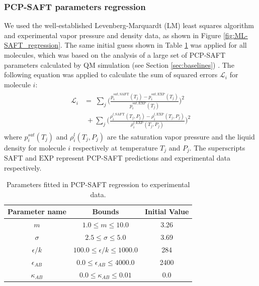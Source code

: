 \subsubsection{PCP-SAFT parameters regression}

We used the well-established Levenberg-Marquardt (LM) least squares algorithm and experimental vapor pressure and density data, as shown in Figure \ref{fig:ML-SAFT_regression}. The same initial guess shown in Table \ref{tab:regression_params} was applied for all molecules, which was based on the analysis of a large set of PCP-SAFT parameters calculated by QM simulation (see Section \ref{sec:baselines}) \cite{Kaminski2020}. The following equation was applied to calculate the sum of squared errors $\mathcal{L}_i$ for molecule $i$:
\begin{gather}
\begin{aligned}
    \mathcal{L}_i & = \; \sum_j \biggl(\frac{p_{i}^{sat,\text{SAFT}}(T_j) - p_{i}^{sat,\text{EXP}}(T_j)}{ p_{i}^{sat,\text{EXP}}(T_j)}\biggr)^2 \\
    & \; + \sum_j \biggl(\frac{\rho_{i}^{l,\text{SAFT}}(T_j, P_j) - \rho_{i}^{l,\text{EXP}}(T_j, P_j) }{\rho_{i}^{l,\text{EXP}}(T_j, P_j) }\biggr)^2 
\end{aligned}
\end{gather}
where $p_i^{sat}(T_j)$ and $\rho_{i}^{l}(T_j, P_j)$ are the saturation vapor pressure and the liquid density for molecule $i$ respectively at temperature $T_j$ and $P_j$. The superscripts $\text{SAFT}$ and $\text{EXP}$ represent PCP-SAFT predictions and experimental data respectively. 

\begin{table}
    \centering
    \caption{Parameters fitted in PCP-SAFT regression to experimental data.}
    \label{tab:regression_params}
    \begin{tabular}{ccc}
        Parameter name & Bounds & Initial Value \\
        \hline
        $m$ & $1.0 \leq m \leq 10.0$ & 3.26 \\
        $\sigma$ & $2.5 \leq \sigma \leq 5.0$ & 3.69 \\
        $\epsilon/k$ & $100.0 \leq \epsilon/k \leq 1000.0$ & 284 \\
        $\epsilon_{AB}$ & $0.0 \leq \epsilon_{AB} \leq 4000.0$ & 2400 \\
        $\kappa_{AB}$ & $0.0 \leq \kappa_{AB} \leq 0.01$ & 0.0 \\
    \end{tabular}
\end{table}


